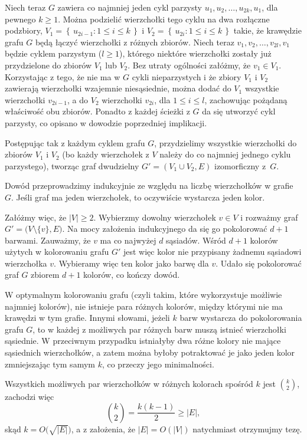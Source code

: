 Niech teraz $G$ zawiera co najmniej jeden cykl parzysty $u_1,u_2,\dots,u_{2k},u_1$, dla pewnego $k\ge1$. Można podzielić wierzchołki tego cyklu na dwa rozłączne podzbiory, $V_1=\left\{\,u_{2i-1}:1\le i\le k\,\right\}$ i $V_2=\left\{\,u_{2i}:1\le i\le k\,\right\}$ takie, że krawędzie grafu $G$ będą łączyć wierzchołki z różnych zbiorów. Niech teraz $v_1,v_2,\dots,v_{2l},v_1$ będzie cyklem parzystym ($l\ge1$), którego niektóre wierzchołki zostały już przydzielone do zbiorów $V_1$ lub $V_2$. Bez utraty ogólności załóżmy, że $v_1\in V_1$. Korzystając z tego, że nie ma w $G$ cykli nieparzystych i że zbiory $V_1$ i $V_2$ zawierają wierzchołki wzajemnie niesąsiednie, można dodać do $V_1$ wszystkie wierzchołki $v_{2i-1}$, a do $V_2$ wierzchołki $v_{2i}$, dla $1\le i\le l$, zachowując pożądaną właściwość obu zbiorów. Ponadto z każdej ścieżki z $G$ da się utworzyć cykl parzysty, co opisano w dowodzie poprzedniej implikacji.

Postępując tak z każdym cyklem grafu $G$, przydzielimy wszystkie wierzchołki do zbiorów $V_1$ i $V_2$ (bo każdy wierzchołek z $V$ należy do co najmniej jednego cyklu parzystego), tworząc graf dwudzielny $G'=(V_1\cup V_2,E)$ izomorficzny z~$G$.

\subproblem %
Dowód przeprowadzimy indukcyjnie ze względu na liczbę wierzchołków w grafie $G$. Jeśli graf ma jeden wierzchołek, to oczywiście wystarcza jeden kolor.

Załóżmy więc, że $|V|\ge2$. Wybierzmy dowolny wierzchołek $v\in V$ i rozważmy graf $G'=\bigl(V\setminus\{v\},E\bigr)$. Na mocy założenia indukcyjnego da się go pokolorować $d+1$ barwami. Zauważmy, że $v$ ma co najwyżej $d$ sąsiadów. Wśród $d+1$ kolorów użytych w kolorowaniu grafu $G'$ jest więc kolor nie przypisany żadnemu sąsiadowi wierzchołka $v$. Wybieramy więc ten kolor jako barwę dla $v$. Udało się pokolorować graf $G$ zbiorem $d+1$ kolorów, co kończy dowód.

\subproblem %
W optymalnym kolorowaniu grafu (czyli takim, które wykorzystuje możliwie najmniej kolorów), nie istnieje para różnych kolorów, między którymi nie ma krawędzi w tym grafie. Innymi słowami, jeżeli $k$ barw wystarcza do pokolorowania grafu $G$, to w każdej z możliwych par różnych barw muszą istnieć wierzchołki sąsiednie. W przeciwnym przypadku istniałyby dwa różne kolory nie mające sąsiednich wierzchołków, a zatem można byłoby potraktować je jako jeden kolor zmniejszając tym samym $k$, co przeczy jego minimalności.

Wszystkich możliwych par wierzchołków w różnych kolorach spośród $k$ jest $\binom{k}{2}$, zachodzi więc
\[
    \binom{k}{2} = \frac{k(k-1)}{2} \ge |E|,
\]
skąd $k=O\bigl(\!\sqrt{|E|}\bigr)$, a z założenia, że $|E|=O(|V|)$ natychmiast otrzymujmy tezę.

